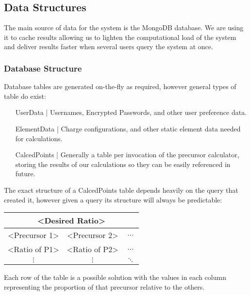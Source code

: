 \subsection{Data Structures}
The main source of data for the system is the MongoDB database. We are using it to cache results allowing us to lighten the computational load of the system and deliver results faster when several users query the system at once.

\subsubsection{Database Structure}
Database tables are generated on-the-fly as required, however general types of table do exist:

\begin{enumerate}[label = {}, leftmargin=\widthof{CalcedPoints |}+\labelsep]
	\item[UserData |] Usernames, Encrypted Passwords, and other user preference data.
	
	\item[ElementData |] Charge configurations, and other static element data needed for calculations.
	
	\item[CalcedPoints |] Generally a table per invocation of the precursor calculator, storing the results of our calculations so they can be easily referenced in future. 
\end{enumerate}

The exact structure of a CalcedPoints table depends heavily on the query that created it, however given a query its structure will always be predictable: 

\begin{table}[h!]
	\centering
	\begin{tabular}{|c|c|c|}
		\hline
		\multicolumn{3}{|c|}{\textless{}Desired Ratio\textgreater{}} \\ \hline
		\textless{}Precursor 1\textgreater{} & \textless{}Precursor 2\textgreater{} & $\dots$ \\ \hline
		\textless{}Ratio of P1\textgreater{} & \textless{}Ratio of P2\textgreater{} & $\dots$ \\
		$\vdots$ & $\vdots$ & $\ddots$ \\
	\end{tabular}
\end{table}

Each row of the table is a possible solution with the values in each column representing the proportion of that precursor relative to the others.

